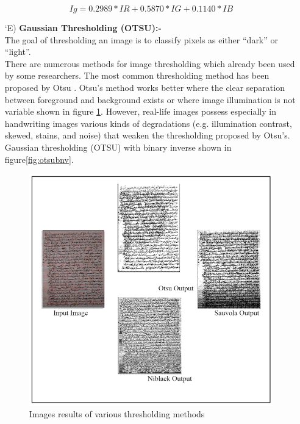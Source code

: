 \begin{itemize}[labelindent=1em,labelsep=0.25cm,leftmargin=*]
        \begin{equation}
            Ig = 0.2989 * IR + 0.5870 * IG + 0.1140 * IB
            \label{equ:gray}
        \end{equation}
        \item[\char `E)] \textbf{Gaussian Thresholding (OTSU):-}\\
        The goal of thresholding \cite{thresholding} an image is to classify pixels as either “dark” or “light”.\\
        There are numerous methods for image thresholding which already been used by some researchers. The most common thresholding method has been proposed by Otsu . Otsu’s method works better where the clear separation between foreground and background exists or where image illumination is not variable shown in figure \ref{fig:otsu}. However, real-life images possess especially in handwriting images various kinds of degradations (e.g. illumination contrast, skewed, stains, and noise) that weaken the thresholding proposed by Otsu’s. Gaussian thresholding (OTSU) with binary inverse shown in figure\ref{fig:otsubnv}.
        \begin{figure}[!htb]
            \centering
            \includegraphics[width=11cm]{images/otsu.png}
            \caption{Images results of various thresholding methods}
            \label{fig:otsu}
        \end{figure}
        

\end{itemize}
